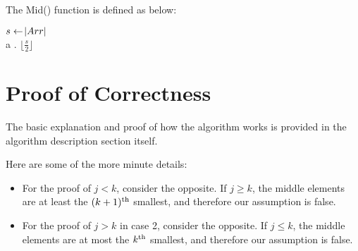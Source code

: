 \documentclass{article}
\begin{document}
The Mid() function is defined as below:

\begin{algorithm}[H]
\begin{algorithmic}[1]
    \State $s \gets \abs{Arr}$
\\
\phantom a \phantom .
    \Return $\lfloor \frac{s}{2} \rfloor$ 
\EndFunction


\end{algorithmic}
\end{algorithm}

\section{Proof of Correctness}

The basic explanation and proof of how the algorithm works is provided in the algorithm description section itself. 

Here are some of the more minute details:

\begin{itemize}
    \item For the proof of $j < k$, consider the opposite. If $j \geq k$, the middle elements are at least the $(k+1)\textsuperscript{th}$ smallest, and therefore our assumption is false.
    \item For the proof of $j > k$ in case 2, consider the opposite. If $j \leq k$, the middle elements are at most the $k\textsuperscript{th}$ smallest, and therefore our assumption is false.
\end{itemize}
\end{document}
